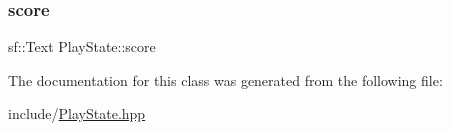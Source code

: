 \subsubsection{\texorpdfstring{score}{score}}
{\footnotesize\ttfamily sf\+::\+Text Play\+State\+::score\hspace{0.3cm}{\ttfamily [private]}}



The documentation for this class was generated from the following file\+:\begin{DoxyCompactItemize}
\item 
include/\mbox{\hyperlink{_play_state_8hpp}{Play\+State.\+hpp}}\end{DoxyCompactItemize}
